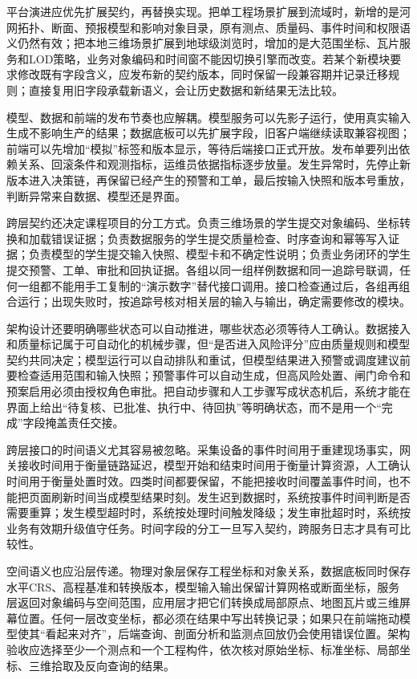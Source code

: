 平台演进应优先扩展契约，再替换实现。把单工程场景扩展到流域时，新增的是河网拓扑、断面、预报模型和影响对象目录，原有测点、质量码、事件时间和权限语义仍然有效；把本地三维场景扩展到地球级浏览时，增加的是大范围坐标、瓦片服务和LOD策略，业务对象编码和时间窗不能因切换引擎而改变。若某个新模块要求修改既有字段含义，应发布新的契约版本，同时保留一段兼容期并记录迁移规则；直接复用旧字段承载新语义，会让历史数据和新结果无法比较。

模型、数据和前端的发布节奏也应解耦。模型服务可以先影子运行，使用真实输入生成不影响生产的结果；数据底板可以先扩展字段，旧客户端继续读取兼容视图；前端可以先增加“模拟”标签和版本显示，等待后端接口正式开放。发布单要列出依赖关系、回滚条件和观测指标，运维员依据指标逐步放量。发生异常时，先停止新版本进入决策链，再保留已经产生的预警和工单，最后按输入快照和版本号重放，判断异常来自数据、模型还是界面。

跨层契约还决定课程项目的分工方式。负责三维场景的学生提交对象编码、坐标转换和加载错误证据；负责数据服务的学生提交质量检查、时序查询和幂等写入证据；负责模型的学生提交输入快照、模型卡和不确定性说明；负责业务闭环的学生提交预警、工单、审批和回执证据。各组以同一组样例数据和同一追踪号联调，任何一组都不能用手工复制的“演示数字”替代接口调用。接口检查通过后，各组再组合运行；出现失败时，按追踪号核对相关层的输入与输出，确定需要修改的模块。

架构设计还要明确哪些状态可以自动推进，哪些状态必须等待人工确认。数据接入和质量标记属于可自动化的机械步骤，但“是否进入风险评分”应由质量规则和模型契约共同决定；模型运行可以自动排队和重试，但模型结果进入预警或调度建议前要检查适用范围和输入快照；预警事件可以自动生成，但高风险处置、闸门命令和预案启用必须由授权角色审批。把自动步骤和人工步骤写成状态机后，系统才能在界面上给出“待复核、已批准、执行中、待回执”等明确状态，而不是用一个“完成”字段掩盖责任交接。

跨层接口的时间语义尤其容易被忽略。采集设备的事件时间用于重建现场事实，网关接收时间用于衡量链路延迟，模型开始和结束时间用于衡量计算资源，人工确认时间用于衡量处置时效。四类时间都要保留，不能把接收时间覆盖事件时间，也不能把页面刷新时间当成模型结果时刻。发生迟到数据时，系统按事件时间判断是否需要重算；发生模型超时时，系统按处理时间触发降级；发生审批超时时，系统按业务有效期升级值守任务。时间字段的分工一旦写入契约，跨服务日志才具有可比较性。

空间语义也应沿层传递。物理对象层保存工程坐标和对象关系，数据底板同时保存水平CRS、高程基准和转换版本，模型输入输出保留计算网格或断面坐标，服务层返回对象编码与空间范围，应用层才把它们转换成局部原点、地图瓦片或三维屏幕位置。任何一层改变坐标，都必须在结果中写出转换记录；如果只在前端拖动模型使其“看起来对齐”，后端查询、剖面分析和监测点回放仍会使用错误位置。架构验收应选择至少一个测点和一个工程构件，依次核对原始坐标、标准坐标、局部坐标、三维拾取及反向查询的结果。

